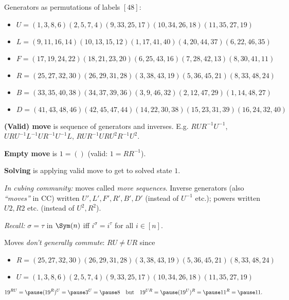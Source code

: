 \begin{slide}
    Generators as permutations of labels $[48]$:

    {\scriptsize
    \begin{itemize}
        \item $U = ( 1, 3, 8, 6)( 2, 5, 7, 4)( 9,33,25,17)(10,34,26,18)(11,35,27,19)$
        \item $L = ( 9,11,16,14)(10,13,15,12)( 1,17,41,40)( 4,20,44,37)( 6,22,46,35)$
        \item $F = (17,19,24,22)(18,21,23,20)( 6,25,43,16)( 7,28,42,13)( 8,30,41,11)$
        \item $R = (25,27,32,30)(26,29,31,28)( 3,38,43,19)( 5,36,45,21)( 8,33,48,24)$
        \item $B = (33,35,40,38)(34,37,39,36)( 3, 9,46,32)( 2,12,47,29)( 1,14,48,27)$
        \item $D = (41,43,48,46)(42,45,47,44)(14,22,30,38)(15,23,31,39)(16,24,32,40)$
    \end{itemize}} \pause

    \textbf{(Valid) move} is sequence of generators and inverses. E.g. $RUR^{-1}U^{-1}$, \pause $URU^{-1}L^{-1}UR^{-1}U^{-1}L$, \pause $RUR^{-1}URU^2R^{-1}U^2$.

    \textbf{Empty move} is $1 = ()$ (valid: $1 = RR^{-1}$). \pause

    \textbf{Solving} is applying valid move to get to solved state $1$.
\end{slide}

\begin{slide}
    \textit{In cubing community:} moves called \textit{move sequences}. Inverse generators (also \textit{``moves''} in CC) written $U',L',F',R',B',D'$ (instead of $U^{-1}$ etc.); powers written $U2,R2$ etc. (instead of $U^2,R^2$). \pause

    \textit{Recall:} $\sigma = \tau$ in $\Sym(n)$ iff $i^\sigma = i^\tau$ for all $i \in [n]$. \pause

    Moves \textit{don't generally commute}: $RU \neq UR$ since

        {\scriptsize
            \begin{itemize}
                \item $R = (25,27,32,30)(26,29,31,28)( 3,38,43,19)( 5,36,45,21)( 8,33,48,24)$
                \item $U = ( 1, 3, 8, 6)( 2, 5, 7, 4)( 9,33,25,17)(10,34,26,18)(11,35,27,19)$
            \end{itemize}}

    \vspace{-1cm}
    $$19^{RU} = \pause (19^R)^U = \pause 3^U = \pause 8 \quad\text{but}\quad 19^{UR} = \pause (19^U)^R = \pause 11^R = \pause 11.$$
\end{slide}


